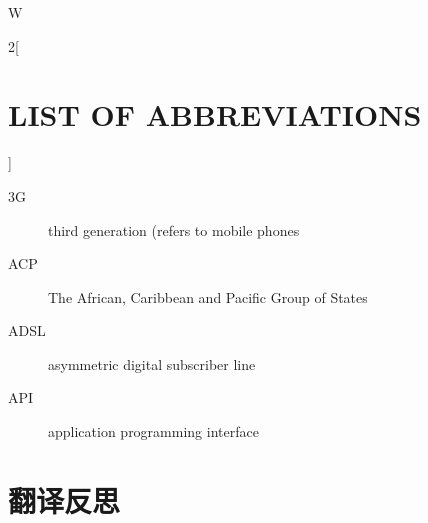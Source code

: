 \documentclass[a4paper, UTF8, 12pt]{article}
\begin{document}
W
\begin{paracol}{2}[\section{LIST OF ABBREVIATIONS}]
    \begin{description}
        \item[3G] third generation (refers to mobile phones
        \item[ACP] The African, Caribbean and Pacific Group of States 
        \item[ADSL] asymmetric digital subscriber line 
        \item[API] application programming interface 
         
    \end{description}
\end{paracol}



\section{翻译反思}
\end{document}
